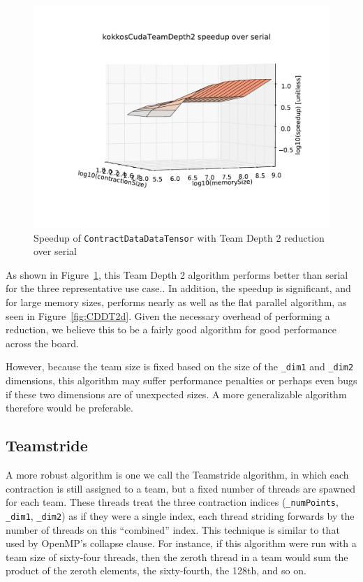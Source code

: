 \begin{figure}[ht]
    \includegraphics[scale=.55]{./VersusSerial_kokkosCudaTeamDepth2_clearCache_shadowfax}
    \caption[Performance of \texttt{ContractDataDataTensor} Team Depth
    2]{Speedup of \texttt{ContractDataDataTensor} with Team Depth 2 reduction
    over serial
\label{fig:ContractDataDataTensorDepth2}} 
\end{figure}

As shown in Figure~\ref{fig:ContractDataDataTensorDepth2}, this Team Depth 2
algorithm performs better than serial for the three representative use case..
In addition, the speedup is significant, and for large memory sizes, performs
nearly as well as the flat parallel algorithm, as seen in
Figure~\ref{fig:CDDT2d}.  Given the necessary overhead of
performing a reduction, we believe this to be a fairly good algorithm for good
performance across the
board.

However, because the team size is fixed based on the size of the \texttt{\_dim1}
and \texttt{\_dim2} dimensions, this algorithm may suffer performance penalties
or perhaps even bugs if these two dimensions are of unexpected sizes.  A more
generalizable algorithm therefore would be preferable.

\subsection{Teamstride}\label{sec:Teamstride}
    A more robust algorithm is one we call the Teamstride algorithm, in which
    each contraction is still assigned to a team, but a fixed number of threads
    are spawned for each team.  These threads treat the three contraction
    indices (\texttt{\_numPoints}, \texttt{\_dim1}, \texttt{\_dim2}) as if they were
    a single index, each thread striding forwards by the number of threads on
    this ``combined'' index.  This technique is similar to that used by OpenMP's
    collapse clause.  For instance, if this algorithm were run with a team size
    of sixty-four threads, then the zeroth thread in a team would sum the
    product of the zeroth elements, the sixty-fourth, the 128th, and so on.
    
